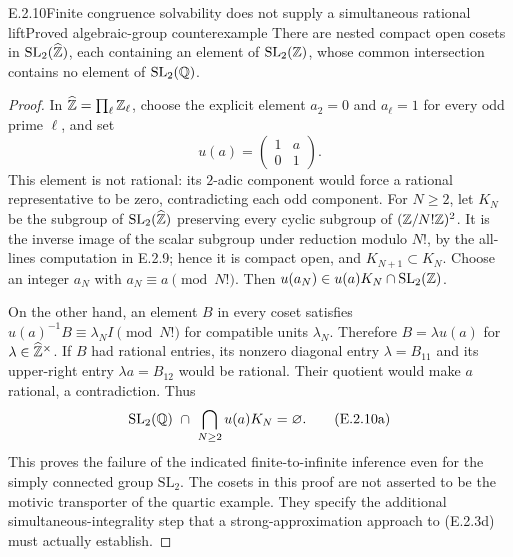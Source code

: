 \begin{result}{E.2.10}{Finite congruence solvability does not supply a simultaneous rational lift}{Proved algebraic-group counterexample}
There are nested compact open cosets in
$\mathrm{SL}_2(\widehat{\mathbb Z})$, each containing an element of
$\mathrm{SL}_2(\mathbb Z)$, whose common intersection contains no element
of $\mathrm{SL}_2(\mathbb Q)$.
\end{result}
\begin{proof}
In $\widehat{\mathbb Z}=\prod_\ell\mathbb Z_\ell$, choose the explicit element
$a_2=0$ and $a_\ell=1$ for every odd prime $\ell$, and set
\[
 u(a)=\begin{pmatrix}1&a\\0&1\end{pmatrix}.
 \]
This element is not rational: its $2$-adic component would force a
rational representative to be zero, contradicting each odd component.
For $N\ge2$, let $K_N$ be the subgroup of
$\mathrm{SL}_2(\widehat{\mathbb Z})$ preserving every cyclic subgroup of
$(\mathbb Z/N!\mathbb Z)^2$. It is the inverse image of the scalar subgroup
under reduction modulo $N!$, by the all-lines computation in
E.2.9; hence it is compact open, and $K_{N+1}\subset K_N$.
Choose an integer $a_N$ with $a_N\equiv a\pmod{N!}$.
Then $u(a_N)\in u(a)K_N\cap\mathrm{SL}_2(\mathbb Z)$.

On the other hand, an element $B$ in every coset satisfies
$u(a)^{-1}B\equiv\lambda_N I\pmod{N!}$ for compatible units
$\lambda_N$. Therefore $B=\lambda u(a)$ for
$\lambda\in\widehat{\mathbb Z}^\times$. If $B$ had rational entries, its
nonzero diagonal entry $\lambda=B_{11}$ and its upper-right
entry $\lambda a=B_{12}$ would be rational. Their quotient
would make $a$ rational, a contradiction. Thus
\[
 \mathrm{SL}_2(\mathbb Q)\ \cap\
       \bigcap_{N\ge2}u(a)K_N=\varnothing.
 \tag{E.2.10a}
\]
This proves the failure of the indicated finite-to-infinite inference
even for the simply connected group $\mathrm{SL}_2$. The cosets in
this proof are not asserted to be the motivic transporter of the
quartic example. They specify the additional simultaneous-integrality
step that a strong-approximation approach to (E.2.3d) must actually
establish.
\end{proof}





